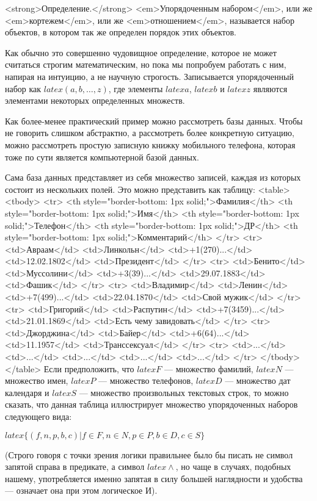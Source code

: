 <strong>Определение.</strong> <em>Упорядоченным набором</em>, или же <em>кортежем</em>, или же <em>отношением</em>, называется набор объектов, в котором так же определен порядок этих объектов.

Как обычно это совершенно чудовищное определение, которое не может считаться строгим математическим, но пока мы попробуем работать с ним, напирая на интуицию, а не научную строгость. Записывается упорядоченный набор как $latex (a, b, \ldots, z)$, где элементы $latex a$, $latex b$ и $latex z$ являются элементами некоторых определенных множеств.

Как более-менее практический пример можно рассмотреть базы данных. Чтобы не говорить слишком абстрактно, а рассмотреть более конкретную ситуацию, можно рассмотреть простую записную книжку мобильного телефона, которая тоже по сути является компьютерной базой данных.

Сама база данных представляет из себя множество записей, каждая из которых состоит из нескольких полей. Это можно представить как таблицу:
<table>
<tbody>
<tr>
<th style="border-bottom: 1px solid;">Фамилия</th>
<th style="border-bottom: 1px solid;">Имя</th>
<th style="border-bottom: 1px solid;">Телефон</th>
<th style="border-bottom: 1px solid;">ДР</th>
<th style="border-bottom: 1px solid;">Комментарий</th>
</tr>
<tr>
<td>Авраам</td>
<td>Линкольн</td>
<td>+1(270)...</td>
<td>12.02.1802</td>
<td>Президент</td>
</tr>
<tr>
<td>Бенито</td>
<td>Муссолини</td>
<td>+3(39)...</td>
<td>29.07.1883</td>
<td>Фашик</td>
</tr>
<tr>
<td>Владимир</td>
<td>Ленин</td>
<td>+7(499)...</td>
<td>22.04.1870</td>
<td>Свой мужик</td>
</tr>
<tr>
<td>Григорий</td>
<td>Распутин</td>
<td>+7(3459)...</td>
<td>21.01.1869</td>
<td>Есть чему завидовать</td>
</tr>
<tr>
<td>Джорджина</td>
<td>Байер</td>
<td>+6(64)...</td>
<td>11.1957</td>
<td>Транссексуал</td>
</tr>
<tr>
<td>...</td>
<td>...</td>
<td>...</td>
<td>...</td>
<td>...</td>
</tr>
</tbody>
</table>
Если предположить, что $latex F$ — множество фамилий, $latex N$ — множество имен, $latex P$ — множество телефонов, $latex D$ — множество дат календаря и $latex S$ — множество произвольных текстовых строк, то можно сказать, что данная таблица иллюстрирует множество упорядоченных наборов следующего вида:

$latex \{(f, n, p, b, c)|f\in F, n \in N, p \in P, b \in D, c \in S\}$

(Строго говоря с точки зрения логики правильнее было бы писать не символ запятой справа в предикате, а символ $latex \wedge$, но чаще в случаях, подобных нашему, употребляется именно запятая в силу большей наглядности и удобства — означает она при этом логическое И).

